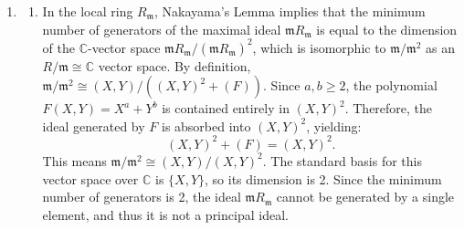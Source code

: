 \documentclass[10pt,a4paper]{article}
\begin{document}
\begin{enumerate}[label=\fbox{\arabic*}]
\begin{enumerate}[label=(\arabic*)]
          \item Subgroups $K \subset G$ with $[G : K] = 2$ correspond to kernels of surjective homomorphisms $\phi : G \to \{1, -1\}$. Such homomorphisms must contain the commutator subgroup $[G, G]$ in their kernel.
          The commutators are $[X_{a,b}, X_{c,d}] = I$ and $[X_{a,b}, S] = X_{a-b, b-a}$. Thus, $[G, G]$ is generated by $X_{1, -1}$, meaning $\phi(X_{1, -1}) = 1$, which implies $\phi(X_{1,0}) = \phi(X_{0,1})$.
          Let $x = \phi(X_{1,0}) \in \{1, -1\}$ and $s = \phi(S) \in \{1, -1\}$. Then $\phi(X_{a,b}) = x^{a+b}$ and $\phi(X_{a,b}S) = x^{a+b}s$.
          The condition $x^{2n} = 1$ is trivially satisfied for $x \in \{1, -1\}$. Any choice of $x, s \in \{1, -1\}$ defines a valid homomorphism.
          Since $\phi$ must be surjective to yield $[G : K] = 2$, we cannot have $x=1$ and $s=1$. The remaining 3 pairs $(x, s) \in \{(1, -1), (-1, 1), (-1, -1)\}$ give distinct surjective homomorphisms. Thus, there are exactly $3$ such subgroups.
        \end{enumerate}

  \item %
        \begin{enumerate}[label=(\arabic*)]
          \item In the local ring $R_\mathfrak{m}$, Nakayama's Lemma implies that the minimum number of generators of the maximal ideal $\mathfrak{m} R_\mathfrak{m}$ is equal to the dimension of the $\mathbb{C}$-vector space $\mathfrak{m} R_\mathfrak{m} / (\mathfrak{m} R_\mathfrak{m})^2$, which is isomorphic to $\mathfrak{m} / \mathfrak{m}^2$ as an $R/\mathfrak{m} \cong \mathbb{C}$ vector space.
          By definition, $\mathfrak{m} / \mathfrak{m}^2 \cong (X, Y) / ((X, Y)^2 + (F))$.
          Since $a, b \ge 2$, the polynomial $F(X, Y) = X^a + Y^b$ is contained entirely in $(X, Y)^2$. Therefore, the ideal generated by $F$ is absorbed into $(X, Y)^2$, yielding:
          \[
            (X, Y)^2 + (F) = (X, Y)^2.
          \]
          This means $\mathfrak{m} / \mathfrak{m}^2 \cong (X, Y) / (X, Y)^2$. The standard basis for this vector space over $\mathbb{C}$ is $\{X, Y\}$, so its dimension is 2. Since the minimum number of generators is 2, the ideal $\mathfrak{m} R_\mathfrak{m}$ cannot be generated by a single element, and thus it is not a principal ideal.


\end{enumerate}
\end{enumerate}
\end{document}
